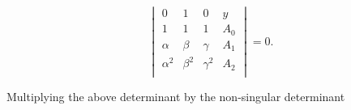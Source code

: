 \begin{equation}
\begin{vmatrix}
0            & 1           & 0               &  y    \\
1            & 1           & 1               &  A_0\\
\alpha    & \beta     & \gamma    &  A_1\\
\alpha^2 & \beta^2 & \gamma^2 & A_2 \\
\end{vmatrix} = 0.
\end{equation}

Multiplying the above determinant by the non-singular determinant 



